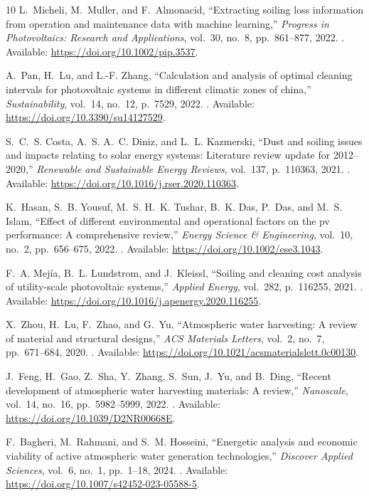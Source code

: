 \documentclass[12pt,a4paper]{report}   %
\begin{document}
\begin{thebibliography}{10}
L.~Micheli, M.~Muller, and F.~Almonacid, ``Extracting soiling loss information
  from operation and maintenance data with machine learning,'' {\em Progress in
  Photovoltaics: Research and Applications}, vol.~30, no.~8, pp.~861--877,
  2022.
\newblock [Online]. Available: \url{https://doi.org/10.1002/pip.3537}.

A.~Pan, H.~Lu, and L.-F. Zhang, ``Calculation and analysis of optimal cleaning
  intervals for photovoltaic systems in different climatic zones of china,''
  {\em Sustainability}, vol.~14, no.~12, p.~7529, 2022.
\newblock [Online]. Available: \url{https://doi.org/10.3390/su14127529}.

S.~C.~S. Costa, A.~S. A.~C. Diniz, and L.~L. Kazmerski, ``Dust and soiling
  issues and impacts relating to solar energy systems: Literature review update
  for 2012--2020,'' {\em Renewable and Sustainable Energy Reviews}, vol.~137,
  p.~110363, 2021.
\newblock [Online]. Available:
  \url{https://doi.org/10.1016/j.rser.2020.110363}.

K.~Hasan, S.~B. Yousuf, M.~S. H.~K. Tushar, B.~K. Das, P.~Das, and M.~S. Islam,
  ``Effect of different environmental and operational factors on the pv
  performance: A comprehensive review,'' {\em Energy Science \& Engineering},
  vol.~10, no.~2, pp.~656--675, 2022.
\newblock [Online]. Available: \url{https://doi.org/10.1002/ese3.1043}.

F.~A. Mej{\'i}a, B.~L. Lundstrom, and J.~Kleissl, ``Soiling and cleaning cost
  analysis of utility-scale photovoltaic systems,'' {\em Applied Energy},
  vol.~282, p.~116255, 2021.
\newblock [Online]. Available:
  \url{https://doi.org/10.1016/j.apenergy.2020.116255}.

X.~Zhou, H.~Lu, F.~Zhao, and G.~Yu, ``Atmospheric water harvesting: A review of
  material and structural designs,'' {\em {ACS} Materials Letters}, vol.~2,
  no.~7, pp.~671--684, 2020.
\newblock [Online]. Available:
  \url{https://doi.org/10.1021/acsmaterialslett.0c00130}.

J.~Feng, H.~Gao, Z.~Sha, Y.~Zhang, S.~Sun, J.~Yu, and B.~Ding, ``Recent
  development of atmospheric water harvesting materials: A review,'' {\em
  Nanoscale}, vol.~14, no.~16, pp.~5982--5999, 2022.
\newblock [Online]. Available: \url{https://doi.org/10.1039/D2NR00668E}.

F.~Bagheri, M.~Rahmani, and S.~M. Hosseini, ``Energetic analysis and economic
  viability of active atmospheric water generation technologies,'' {\em
  Discover Applied Sciences}, vol.~6, no.~1, pp.~1--18, 2024.
\newblock [Online]. Available:
  \url{https://doi.org/10.1007/s42452-023-05588-5}.


\end{thebibliography}
\end{document}
